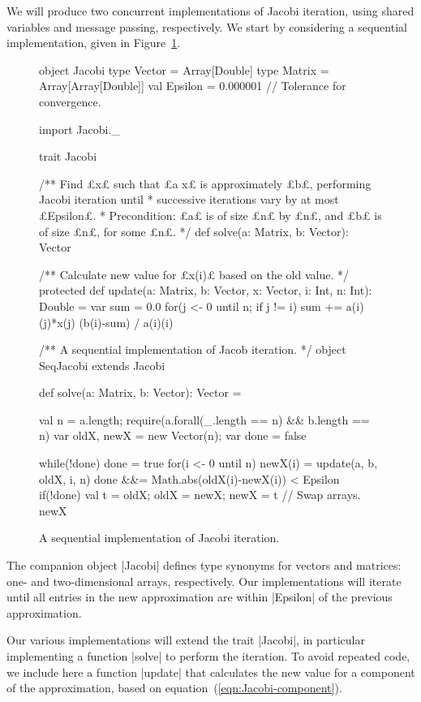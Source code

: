 We will produce two concurrent implementations of Jacobi iteration, using
shared variables and message passing, respectively.  We start by considering a
sequential implementation, given in Figure~\ref{fig:seq-Jacobi}.


\begin{figure}
\begin{scala}
object Jacobi{
  type Vector = Array[Double]
  type Matrix = Array[Array[Double]]
  val Epsilon = 0.000001 // Tolerance for convergence.
}

import Jacobi._

trait Jacobi{
  /** Find £x£ such that £a x£ is approximately £b£, performing Jacobi iteration until
    * successive iterations vary by at most £Epsilon£.
    * Precondition: £a£ is of size £n£ by £n£, and £b£ is of size £n£, for some £n£. */
  def solve(a: Matrix, b: Vector): Vector

  /** Calculate new value for £x(i)£ based on the old value. */ 
  protected def update(a: Matrix, b: Vector, x: Vector, i: Int, n: Int): Double = {
    var sum = 0.0
    for(j <- 0 until n; if j != i) sum += a(i)(j)*x(j)
    (b(i)-sum) / a(i)(i)
  }
}

/** A sequential implementation of Jacob iteration. */
object SeqJacobi extends Jacobi{
  def solve(a: Matrix, b: Vector): Vector = {
    val n = a.length; require(a.forall(_.length == n) && b.length == n)
    var oldX, newX = new Vector(n); var done = false

    while(!done){
      done = true
      for(i <- 0 until n){
        newX(i) = update(a, b, oldX, i, n)
	done &&= Math.abs(oldX(i)-newX(i)) < Epsilon
      }
      if(!done){ val t = oldX; oldX = newX; newX = t } // Swap arrays.
    }
    newX
  }
}
\end{scala}
\caption{A sequential implementation of Jacobi iteration.}
\label{fig:seq-Jacobi}
\end{figure}


The companion object |Jacobi| defines type synonyms for vectors and matrices:
one- and two-dimensional arrays, respectively.  Our implementations will
iterate until all entries in the new approximation are within |Epsilon| of the
previous approximation.

Our various implementations will extend the trait |Jacobi|, in particular
implementing a function |solve| to perform the iteration.  To avoid repeated
code, we include here a  function |update| that calculates the new value for a
component of the approximation, based on
equation~(\ref{eqn:Jacobi-component}). 

